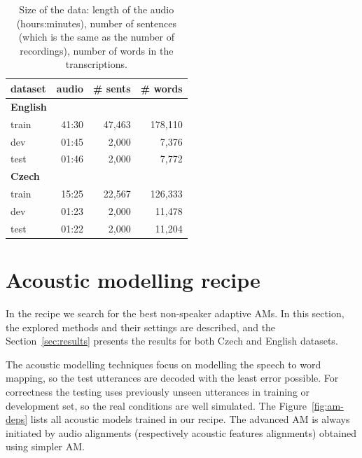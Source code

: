 \begin{table}[hbp]
    \centering
    \begin{tabular}{lrrr}
        \hline
            dataset & audio & \# sents & \# words \\
        \hline
        \textbf{English} & & & \\
                train & 41:30 & 47,463 & 178,110 \\
                dev & 01:45 & 2,000 & 7,376 \\
                test & 01:46 & 2,000 & 7,772 \\
        \hline
        \textbf{Czech} & & & \\
                train & 15:25 & 22,567 & 126,333 \\
                dev & 01:23 & 2,000 & 11,478 \\
                test & 01:22 & 2,000 & 11,204 \\
        \hline
		\end{tabular}
    \caption{Size of the data: length of the audio (hours:minutes), number of sentences
        (which is the same as the number of recordings), number of words in the 
    transcriptions.\cite{korvas_2014}}
    \label{tab:audio}
\end{table}





\section{Acoustic modelling recipe}
\label{sec:am_train}

In the recipe we search for the best non-speaker adaptive \acp{AM}. 
In this section, the explored methods and their settings are described, and the Section~\ref{sec:results} presents the results for both Czech and English datasets.

The acoustic modelling techniques focus on modelling the speech to word mapping, so the test utterances are decoded with the least error possible. 
For correctness the testing uses previously unseen utterances in training or development set, so the real conditions are well simulated.
The Figure~\ref{fig:am-deps} lists all acoustic models trained in our recipe.
The advanced \ac{AM} is always initiated by audio alignments (respectively acoustic features alignments) obtained using simpler \ac{AM}.

